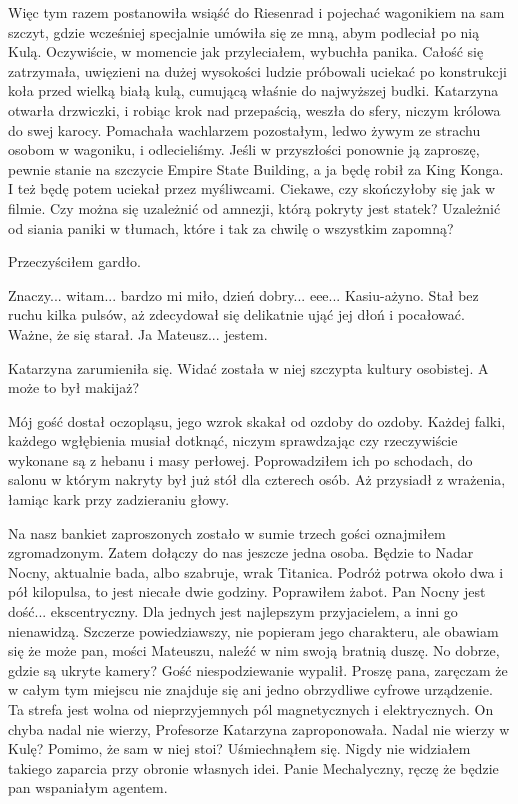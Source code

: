 Więc tym razem postanowiła wsiąść do Riesenrad i pojechać wagonikiem na sam szczyt, gdzie wcześniej specjalnie umówiła się ze mną, abym podleciał po nią Kulą.
Oczywiście, w momencie jak przyleciałem, wybuchła panika. 
Całość się zatrzymała, uwięzieni na dużej wysokości ludzie próbowali uciekać po konstrukcji koła przed wielką białą kulą, cumującą właśnie do najwyższej budki. 
Katarzyna otwarła drzwiczki, i robiąc krok nad przepaścią, weszła do sfery, niczym królowa do swej karocy.
Pomachała wachlarzem pozostałym, ledwo żywym ze strachu osobom w wagoniku, i odlecieliśmy.
Jeśli w przyszłości ponownie ją zaproszę, pewnie stanie na szczycie Empire State Building, a ja będę robił za King Konga.
I też będę potem uciekał przez myśliwcami. Ciekawe, czy skończyłoby się jak w filmie.
Czy można się uzależnić od amnezji, którą pokryty jest statek?
Uzależnić od siania paniki w tłumach, które i tak za chwilę o wszystkim zapomną?

Przeczyściłem gardło.
\begin{dialogue}
\ds{} Znaczy... witam... bardzo mi miło, dzień dobry... eee... Kasiu-ażyno. \dm{} Stał bez ruchu kilka pulsów, aż zdecydował się delikatnie ująć jej dłoń i pocałować.
Ważne, że się starał. \dm{} Ja Mateusz... jestem.
\end{dialogue}

Katarzyna zarumieniła się. Widać została w niej szczypta kultury osobistej. A może to był makijaż?

Mój gość dostał oczopląsu, jego wzrok skakał od ozdoby do ozdoby. 
Każdej falki, każdego wgłębienia musiał dotknąć, niczym sprawdzając czy rzeczywiście wykonane są z hebanu i masy perłowej. 
Poprowadziłem ich po schodach, do salonu w którym nakryty był już stół dla czterech osób.
Aż przysiadł z wrażenia, łamiąc kark przy zadzieraniu głowy.
\begin{dialogue}
\ds{} Na nasz bankiet zaproszonych zostało w sumie trzech gości \dm{} oznajmiłem zgromadzonym. \dm{} Zatem dołączy do nas jeszcze jedna osoba.
Będzie to Nadar Nocny, aktualnie bada, albo szabruje, wrak Titanica. Podróż potrwa około dwa i pół kilopulsa, to jest niecałe dwie godziny.
\dm{} Poprawiłem żabot. \dm{}
Pan Nocny jest dość... ekscentryczny. Dla jednych jest najlepszym przyjacielem, a inni go nienawidzą.
Szczerze powiedziawszy, nie popieram jego charakteru, ale obawiam się że może pan, mości Mateuszu, naleźć w nim swoją bratnią duszę.
\ds{} No dobrze, gdzie są ukryte kamery? \dm{} Gość niespodziewanie wypalił.
\ds{} Proszę pana, zaręczam że w całym tym miejscu nie znajduje się ani jedno obrzydliwe cyfrowe urządzenie. 
Ta strefa jest wolna od nieprzyjemnych pól magnetycznych i elektrycznych.
\ds{} On chyba nadal nie wierzy, Profesorze \dm{} Katarzyna zaproponowała. 
\ds{} Nadal nie wierzy w Kulę? Pomimo, że sam w niej stoi? \dm{} Uśmiechnąłem się. \dm{} 
Nigdy nie widziałem takiego zaparcia przy obronie własnych idei. Panie Mechalyczny, ręczę że będzie pan wspaniałym agentem.
\end{dialogue}

